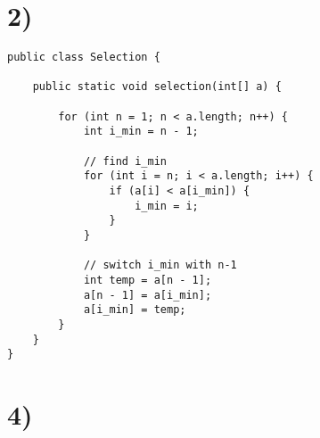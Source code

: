 \documentclass[12pt]{article}
\date{}
\begin{document}
\section{2)}
\begin{lstlisting}
public class Selection {

    public static void selection(int[] a) {

        for (int n = 1; n < a.length; n++) {
            int i_min = n - 1;

            // find i_min
            for (int i = n; i < a.length; i++) {
                if (a[i] < a[i_min]) {
                    i_min = i;
                }
            }

            // switch i_min with n-1
            int temp = a[n - 1];
            a[n - 1] = a[i_min];
            a[i_min] = temp;
        }
    }
}
\end{lstlisting}

\pagebreak

\section{4)}
\end{document}
